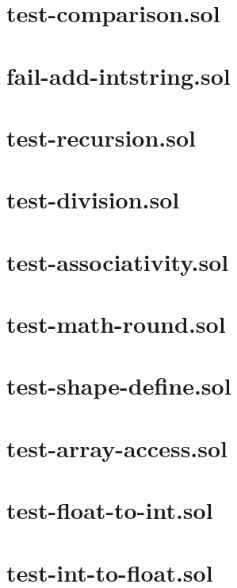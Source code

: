 \section{test-comparison.sol}


\section{fail-add-intstring.sol}


\section{test-recursion.sol}


\section{test-division.sol}


\section{test-associativity.sol}


\section{test-math-round.sol}


\section{test-shape-define.sol}


\section{test-array-access.sol}


\section{test-float-to-int.sol}


\section{test-int-to-float.sol}


